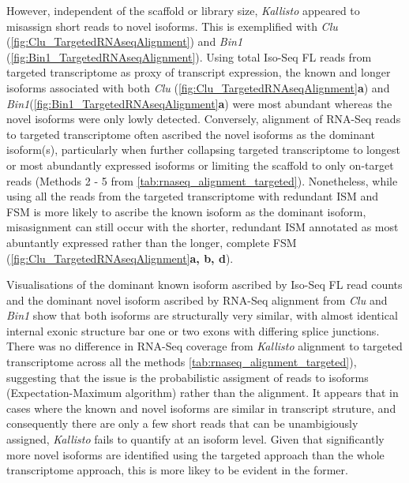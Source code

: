 However, independent of the scaffold or library size, \textit{Kallisto} appeared to misassign short reads to novel isoforms. This is exemplified with \textit{Clu} (\cref{fig:Clu_TargetedRNAseqAlignment}) and \textit{Bin1} (\cref{fig:Bin1_TargetedRNAseqAlignment}).   Using total Iso-Seq FL reads from targeted transcriptome as proxy of transcript expression, the known and longer isoforms associated with both \textit{Clu} (\cref{fig:Clu_TargetedRNAseqAlignment}\textbf{a}) and \textit{Bin1}(\cref{fig:Bin1_TargetedRNAseqAlignment}\textbf{a}) were most abundant whereas the novel isoforms were only lowly detected. Conversely, alignment of RNA-Seq reads to targeted transcriptome often ascribed the novel isoforms as the dominant isoform(s), particularly when further collapsing targeted transcriptome to longest or most abundantly expressed isoforms or limiting the scaffold to only on-target reads (Methods 2 - 5 from \cref{tab:rnaseq_alignment_targeted}). Nonetheless, while using all the reads from the targeted transcriptome with redundant ISM and FSM is more likely to ascribe the known isoform as the dominant isoform, misasignment can still occur with the shorter, redundant ISM annotated as most abuntantly expressed rather than the longer, complete FSM (\cref{fig:Clu_TargetedRNAseqAlignment}\textbf{a, b, d}).

Visualisations of the dominant known isoform ascribed by Iso-Seq FL read counts and the dominant novel isoform ascribed by RNA-Seq alignment from \textit{Clu} and \textit{Bin1} show that both isoforms are structurally very similar, with almost identical internal exonic structure bar one or two exons with differing splice junctions. There was no difference in RNA-Seq coverage from \textit{Kallisto} alignment to targeted transcriptome across all the methods \cref{tab:rnaseq_alignment_targeted}), suggesting that the issue is the probabilistic assigment of reads to isoforms (Expectation-Maximum algorithm) rather than the alignment. It appears that in cases where the known and novel isoforms are similar in transcript struture, and consequently there are only a few short reads that can be unambigiously assigned, \textit{Kallisto} fails to quantify at an isoform level. Given that significantly more novel isoforms are identified using the targeted approach than the whole transcriptome approach, this is more likey to be evident in the former.   


